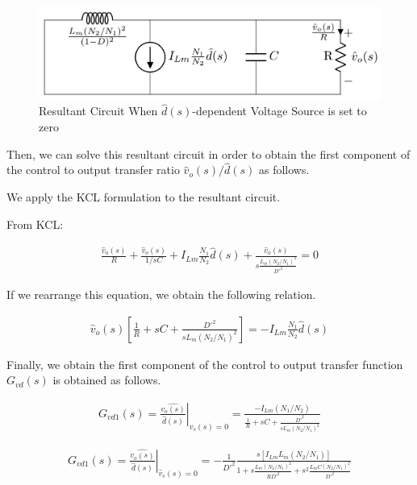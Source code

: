 \begin{figure}[H]
\begin{center}
\includegraphics[width=1\textwidth]{Compensator/flyback_tf2_2.png}
\caption{Resultant Circuit When $\hat{d}(s)$-dependent Voltage Source is set to zero}
\label{com:fly_tf2_2}
\end{center}
\end{figure}

Then, we can solve this resultant circuit in order to obtain the first component of the control to output transfer ratio $\hat{v}_o(s)/\hat{d}(s)$ as follows.

We apply the KCL formulation to the resultant circuit.

From KCL:

\begin{align}
    \frac{\hat{v}_o(s)}{R} + \frac{\hat{v}_o(s)}{1/sC} + I_{Lm}\frac{N_1}{N_2}\hat{d}(s) + \frac{\hat{v}_o(s)}{s\frac{L_m(N_2/N_1)^2}{D'^2}} = 0
\end{align}

If we rearrange this equation, we obtain the following relation.

\begin{align}
    \hat{v}_o(s)\left[\frac{1}{R}+sC+\frac{D'^2}{sL_m(N_2/N_1)^2} \right] = -I_{Lm}\frac{N_1}{N_2}\hat{d}(s)
\end{align}

Finally, we obtain the first component of the control to output transfer function $G_{vd}(s)$ is obtained as follows.

\begin{align}
   \left. G_{vd1}(s) = \frac{\hat{v_o(s)}}{\hat{d}(s)}\right \vert_{\hat{v}_s(s) = 0} = \frac{-I_{Lm}(N_1/N_2)}{\frac{1}{R}+sC+\frac{D'^2}{sL_m(N_2/N_1)^2}}
\end{align}

\begin{align}
   \left. G_{vd1}(s) = \frac{\hat{v_o(s)}}{\hat{d}(s)}\right \vert_{\hat{v}_s(s) = 0} = -\frac{1}{D'^2}\frac{s[I_{Lm}L_m(N_2/N_1)]}{1+s\frac{L_m(N_2/N_1)^2}{RD'^2}+s^2\frac{L_mC(N_2/N_1)^2}{D'^2}}
\end{align}

